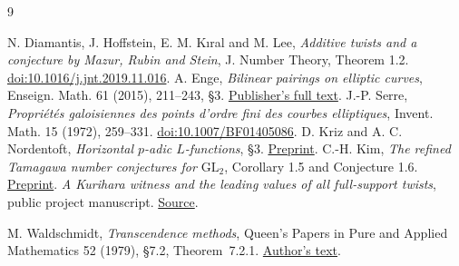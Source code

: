 \documentclass[11pt]{article}
\begin{document}
\begin{thebibliography}{9}\raggedright
{} N. Diamantis, J. Hoffstein, E. M. K{\i}ral and M. Lee,
\emph{Additive twists and a conjecture by Mazur, Rubin and Stein},
J. Number Theory, Theorem 1.2.
\href{https://doi.org/10.1016/j.jnt.2019.11.016}{doi:10.1016/j.jnt.2019.11.016}.
 A. Enge, \emph{Bilinear pairings on elliptic curves},
Enseign. Math. 61 (2015), 211--243, \S3.
\href{https://ems.press/content/serial-article-files/44297?nt=1}{Publisher's full text}.
 J.-P. Serre, \emph{Propri\'et\'es galoisiennes des points
d'ordre fini des courbes elliptiques}, Invent. Math. 15 (1972), 259--331.
\href{https://doi.org/10.1007/BF01405086}{doi:10.1007/BF01405086}.
 D. Kriz and A. C. Nordentoft, \emph{Horizontal $p$-adic $L$-functions}, \S3. \href{https://arxiv.org/abs/2310.20678}{Preprint}.
 C.-H. Kim, \emph{The refined Tamagawa number conjectures for $\mathrm{GL}_2$}, Corollary 1.5 and Conjecture 1.6. \href{https://arxiv.org/abs/2505.09121}{Preprint}.
 \emph{A Kurihara witness and the leading values of all full-support twists}, public project manuscript. \href{https://github.com/cosmosgeek0/BSD/blob/main/kurihara-full-support-twists.tex}{Source}.

 M. Waldschmidt, \emph{Transcendence methods}, Queen's Papers in
Pure and Applied Mathematics 52 (1979), \S7.2, Theorem~7.2.1.
\href{https://webusers.imj-prg.fr/~michel.waldschmidt/articles/pdf/QueensPaper52.pdf}{Author's text}.
\end{thebibliography}
\end{document}
